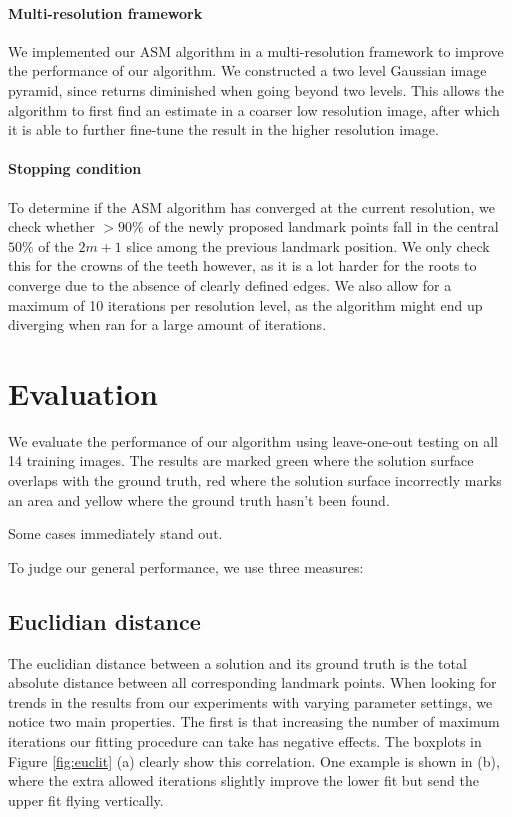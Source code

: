 \documentclass[a4paper,titlepage,12pt]{article}
\begin{document}
\paragraph{Multi-resolution framework}
We implemented our ASM algorithm in a multi-resolution framework to improve the performance of our algorithm.
We constructed a two level Gaussian image pyramid, since returns diminished when going beyond two levels.
This allows the algorithm to first find an estimate in a coarser low resolution image, after which it is able to further fine-tune the result in the higher resolution image.

\paragraph{Stopping condition}

To determine if the ASM algorithm has converged at the current resolution, we check whether $>90\%$ of the newly proposed landmark points fall in the central $50\%$ of the $2m + 1$ slice among the previous landmark position.
We only check this for the crowns of the teeth however, as it is a lot harder for the roots to converge due to the absence of clearly defined edges.
We also allow for a maximum of 10 iterations per resolution level, as the algorithm might end up diverging when ran for a large amount of iterations.

\section{Evaluation}
\label{sec:eval}
We evaluate the performance of our algorithm using leave-one-out testing on all 14 training images. The results are marked {\color{green} green} where the solution surface overlaps with the ground truth, {\color{red} red} where the solution surface incorrectly marks an area and {\color{yellow} yellow} where the ground truth hasn't been found. 

Some cases immediately stand out. %

To judge our general performance, we use three measures:

\subsection{Euclidian distance}
The euclidian distance between a solution and its ground truth is the total absolute distance between all corresponding landmark points. When looking for trends in the results from our experiments with varying parameter settings, we notice two main properties. The first is that increasing the number of maximum iterations our fitting procedure can take has negative effects. The boxplots in Figure \ref{fig:euclit} (a) clearly show this correlation. One example is shown in (b), where the extra allowed iterations slightly improve the lower fit but send the upper fit flying vertically.
\end{document}
